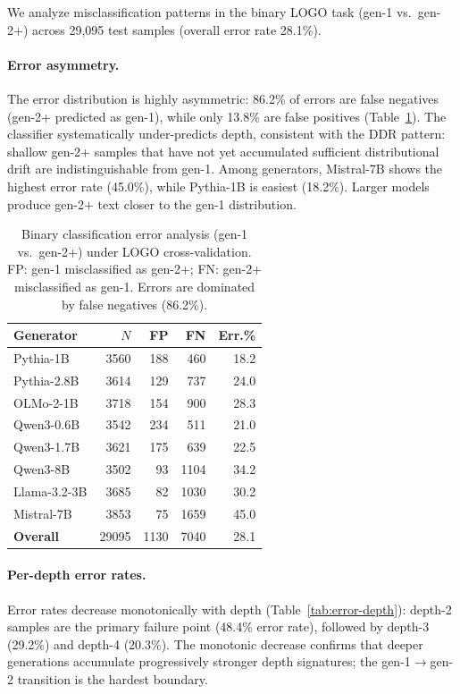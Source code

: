 We analyze misclassification patterns in the binary LOGO task (gen-1 vs.\ gen-2+) across 29,095 test samples (overall error rate 28.1\%).

\paragraph{Error asymmetry.}
The error distribution is highly asymmetric: 86.2\% of errors are false negatives (gen-2+ predicted as gen-1), while only 13.8\% are false positives (Table~\ref{tab:error-analysis}).
The classifier systematically under-predicts depth, consistent with the DDR pattern: shallow gen-2+ samples that have not yet accumulated sufficient distributional drift are indistinguishable from gen-1.
Among generators, Mistral-7B shows the highest error rate (45.0\%), while Pythia-1B is easiest (18.2\%). Larger models produce gen-2+ text closer to the gen-1 distribution.

\begin{table}[ht]
\centering
\small
\caption{Binary classification error analysis (gen-1 vs.\ gen-2+) under LOGO cross-validation. FP: gen-1 misclassified as gen-2+; FN: gen-2+ misclassified as gen-1. Errors are dominated by false negatives (86.2\%).}
\label{tab:error-analysis}
\begin{tabular}{lrrrr}
\toprule
\textbf{Generator} & $N$ & \textbf{FP} & \textbf{FN} & \textbf{Err.\%} \\
\midrule
Pythia-1B & 3560 & 188 & 460 & 18.2 \\
Pythia-2.8B & 3614 & 129 & 737 & 24.0 \\
OLMo-2-1B & 3718 & 154 & 900 & 28.3 \\
Qwen3-0.6B & 3542 & 234 & 511 & 21.0 \\
Qwen3-1.7B & 3621 & 175 & 639 & 22.5 \\
Qwen3-8B & 3502 & 93 & 1104 & 34.2 \\
Llama-3.2-3B & 3685 & 82 & 1030 & 30.2 \\
Mistral-7B & 3853 & 75 & 1659 & 45.0 \\
\midrule
\textbf{Overall} & 29095 & 1130 & 7040 & 28.1 \\
\bottomrule
\end{tabular}
\end{table}

\paragraph{Per-depth error rates.}
Error rates decrease monotonically with depth (Table~\ref{tab:error-depth}): depth-2 samples are the primary failure point (48.4\% error rate), followed by depth-3 (29.2\%) and depth-4 (20.3\%).
The monotonic decrease confirms that deeper generations accumulate progressively stronger depth signatures; the gen-1$\to$gen-2 transition is the hardest boundary.

